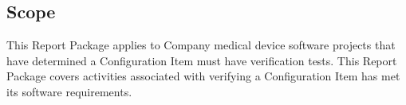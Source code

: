 \subsection{Scope}
This Report Package applies to Company medical device software projects that
have determined a Configuration Item must have verification tests.  This Report
Package covers activities associated with verifying a Configuration Item has met
its software requirements.
